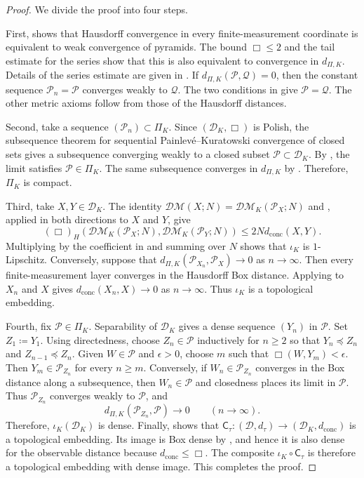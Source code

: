 \documentclass[10pt,a4paper]{amsart}
\newcommand{\D}{\mathcal D}
\newcommand{\DK}{\mathcal D_K}
\newcommand{\DM}{\mathcal{DM}}
\newcommand{\dconc}{d_{\mathrm{conc}}}
\newcommand{\dtau}{d_{\tau}}
\begin{document}
\begin{proof}
We divide the proof into four steps.

First,  shows that Hausdorff convergence in every finite-measurement coordinate is equivalent to weak convergence of pyramids. The bound $\Box\leq2$ and the tail estimate for the series show that this is also equivalent to convergence in $d_{\Pi,K}$. Details of the series estimate are given in . If $d_{\Pi,K}(\mathcal P,\mathcal Q)=0$, then the constant sequence $\mathcal P_n=\mathcal P$ converges weakly to $\mathcal Q$. The two conditions in  give $\mathcal P=\mathcal Q$. The other metric axioms follow from those of the Hausdorff distances.

Second, take a sequence $(\mathcal P_n)\subset\Pi_K$. Since $(\DK,\Box)$ is Polish, the subsequence theorem for sequential Painlev\'e--Kuratowski convergence of closed sets \cite[Theorem~5.2.12]{beer1993topologies} gives a subsequence converging weakly to a closed subset $\mathcal P\subset\DK$. By , the limit satisfies $\mathcal P\in\Pi_K$. The same subsequence converges in $d_{\Pi,K}$ by . Therefore, $\Pi_K$ is compact.

Third, take $X,Y\in\DK$. The identity $\DM(X;N)=\DM_K(\mathcal P_X;N)$ and , applied in both directions to $X$ and $Y$, give
\[
(\Box)_H(\DM_K(\mathcal P_X;N),\DM_K(\mathcal P_Y;N))\leq2N\dconc(X,Y).
\]
Multiplying by the coefficient in  and summing over $N$ shows that $\iota_K$ is $1$-Lipschitz. Conversely, suppose that $d_{\Pi,K}(\mathcal P_{X_n},\mathcal P_X)\to0$ as $n\to\infty$. Then every finite-measurement layer converges in the Hausdorff Box distance. Applying  to $X_n$ and $X$ gives $\dconc(X_n,X)\to0$ as $n\to\infty$. Thus $\iota_K$ is a topological embedding.

Fourth, fix $\mathcal P\in\Pi_K$. Separability of $\DK$ gives a dense sequence $(Y_n)$ in $\mathcal P$. Set $Z_1\coloneqq Y_1$. Using directedness, choose $Z_n\in\mathcal P$ inductively for $n\geq2$ so that $Y_n\preceq Z_n$ and $Z_{n-1}\preceq Z_n$. Given $W\in\mathcal P$ and $\epsilon>0$, choose $m$ such that $\Box(W,Y_m)<\epsilon$. Then $Y_m\in\mathcal P_{Z_n}$ for every $n\geq m$. Conversely, if $W_n\in\mathcal P_{Z_n}$ converges in the Box distance along a subsequence, then $W_n\in\mathcal P$ and closedness places its limit in $\mathcal P$. Thus $\mathcal P_{Z_n}$ converges weakly to $\mathcal P$, and
\[
d_{\Pi,K}(\mathcal P_{Z_n},\mathcal P)\longrightarrow0\qquad(n\to\infty).
\]
Therefore, $\iota_K(\DK)$ is dense. Finally,  shows that $\mathsf C_\tau\colon(\D,\dtau)\to(\DK,\dconc)$ is a topological embedding. Its image is Box dense by , and hence it is also dense for the observable distance because $\dconc\leq\Box$. The composite $\iota_K\circ\mathsf C_\tau$ is therefore a topological embedding with dense image. This completes the proof.
\end{proof}
\end{document}
